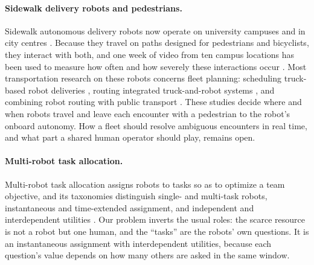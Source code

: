\documentclass[a4paper,fleqn]{cas-dc}
\begin{document}
\paragraph{Sidewalk delivery robots and pedestrians.}
Sidewalk autonomous delivery robots now operate on university campuses and in city centres \cite{jennings2019sidewalk}. Because they travel on paths designed for pedestrians and bicyclists, they interact with both, and one week of video from ten campus locations has been used to measure how often and how severely these interactions occur \cite{gehrke2023observed}. Most transportation research on these robots concerns fleet planning: scheduling truck-based robot deliveries \cite{Boysen2018}, routing integrated truck-and-robot systems \cite{Simoni2020,Ostermeier2023}, and combining robot routing with public transport \cite{DeMaio2024}. These studies decide where and when robots travel and leave each encounter with a pedestrian to the robot's onboard autonomy. How a fleet should resolve ambiguous encounters in real time, and what part a shared human operator should play, remains open.

\paragraph{Multi-robot task allocation.}
Multi-robot task allocation assigns robots to tasks so as to optimize a team objective, and its taxonomies distinguish single- and multi-task robots, instantaneous and time-extended assignment, and independent and interdependent utilities \citep{gerkey2004taxonomy,korsah2013taxonomy}. Our problem inverts the usual roles: the scarce resource is not a robot but one human, and the ``tasks'' are the robots' own questions. It is an instantaneous assignment with interdependent utilities, because each question's value depends on how many others are asked in the same window.
\end{document}

